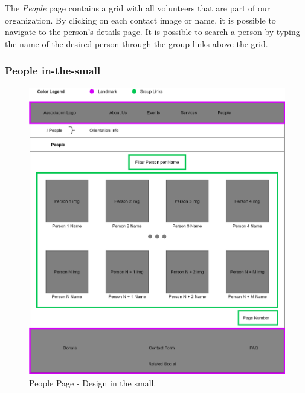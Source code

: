 The \emph{People} page contains a grid with all volunteers that are part of our organization.  By clicking on each contact image or name, it is possible to navigate to the person's details page. It is possible to search a person by typing the name of the desired person  through the group links above the grid. 

\subsubsection{People in-the-small}
\begin{figure}[h!]
		\centering
		\begin{minipage}[b]{1\textwidth}
    			\includegraphics[width=\textwidth]{./assets/people.png}
			\caption{People Page - Design in the small.}
		\end{minipage}
	\end{figure}
	\FloatBarrier

\clearpage

